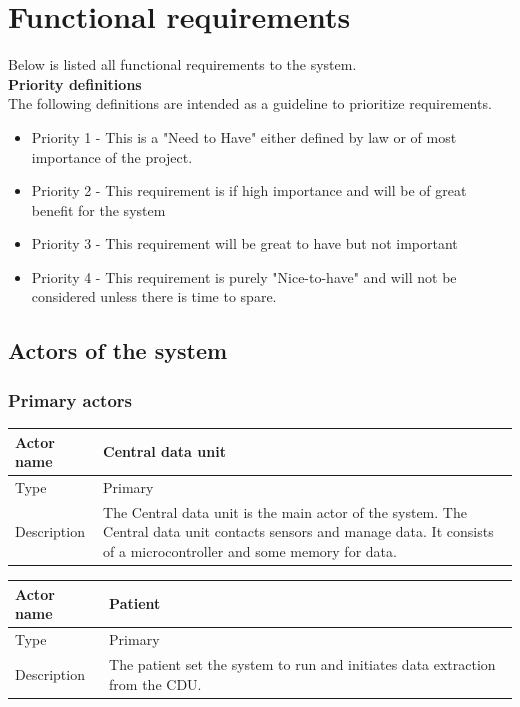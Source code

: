
\section{Functional requirements}
Below is listed all functional requirements to the system.\\
\textbf{\large{Priority definitions}}\\
The following definitions are intended as a guideline to prioritize requirements.
\begin{itemize}[noitemsep,nolistsep]
\item Priority 1 - This is a "Need to Have" either defined by law or of most importance of the project.
\item Priority 2 - This requirement is if high importance and will be of great benefit for the system
\item Priority 3 - This requirement will be great to have but not important
\item Priority 4 - This requirement is purely "Nice-to-have" and will not be considered unless there is time to spare.
\end{itemize}


\subsection{Actors of the system}

\subsubsection{Primary actors}

\begin{table}[H]
	\centering
	\begin{tabular}{|l|p{7cm}|}
	\hline
	Actor name & Central data unit \\ \hline
	Type & Primary \\ \hline
	Description & The Central data unit is the main actor of the system. The Central data unit contacts sensors and manage data. It consists of a microcontroller and some memory for data. \\ \hline
	\end{tabular}
\end{table}

\begin{table}[H]
	\centering
	\begin{tabular}{|l|p{7cm}|}
	\hline
	Actor name & Patient \\ \hline
	Type & Primary \\ \hline
	Description &  The patient set the system to run and initiates data extraction from the CDU.\\ \hline
	\end{tabular}
\end{table}

